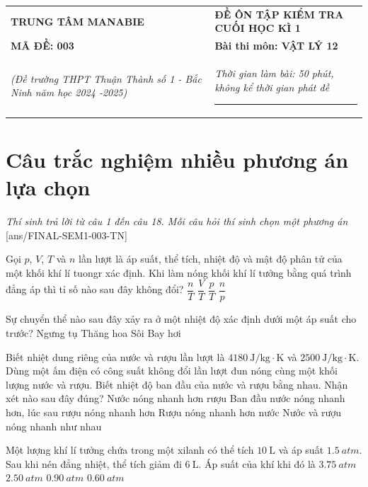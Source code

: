 \begin{tabular}{M{6.5cm}M{11cm}}
	\textbf{TRUNG TÂM MANABIE}& \textbf{ĐỀ ÔN TẬP KIỂM TRA CUỐI HỌC KÌ 1}\\
	\textbf{MÃ ĐỀ: 003}& \textbf{Bài thi môn: VẬT LÝ 12}\\
	\textit{(Đề trường THPT Thuận Thành số 1 - Bắc Ninh năm học 2024 -2025)}& \textit{Thời gian làm bài: 50 phút, không kể thời gian phát đề}
	
	\noindent\rule{4cm}{0.8pt} \\
\end{tabular}
\setcounter{section}{0}
\section{Câu trắc nghiệm nhiều phương án lựa chọn}
\textit{Thí sinh trả lời từ câu 1 đến câu 18. Mỗi câu hỏi thí sinh chọn một phương án}
\setcounter{ex}{0}
[ans/FINAL-SEM1-003-TN]
\begin{ex}
	Gọi $p$, $V$, $T$ và $n$ lần lượt là áp suất, thể tích, nhiệt độ và mật độ phân tử của một khối khí lí tuongr xác định. Khi làm nóng khối khí lí tưởng bằng quá trình đẳng áp thì tỉ số nào sau đây không đổi?
	\choice
	{$\dfrac{n}{T}$}
	{\True $\dfrac{V}{T}$}
	{$\dfrac{p}{T}$}
	{$\dfrac{n}{p}$}
	\loigiai{}
\end{ex}
\begin{ex}
	Sự chuyển thể nào sau đây xảy ra ở một nhiệt độ xác định dưới một áp suất cho trước?
	\choice
	{Ngưng tụ}
	{Thăng hoa}
	{\True Sôi}
	{Bay hơi}
	\loigiai{}
\end{ex}
\begin{ex}
	Biết nhiệt dung riêng của nước và rượu lần lượt là $\SI{4180}{\joule/\kilogram\cdot\kelvin}$ và $\SI{2500}{\joule/\kilogram\cdot\kelvin}$. Dùng một ấm điện có công suất không đổi lần lượt đun nóng cùng một khối lượng nước và rượu. Biết nhiệt độ ban đầu của nước và rượu bằng nhau. Nhận xét nào sau đây đúng?
	\choice
	{Nước nóng nhanh hơn rượu}
	{Ban đầu nước nóng nhanh hơn, lúc sau rượu nóng nhanh hơn}
	{\True Rượu nóng nhanh hơn nước}
	{Nước và rượu nóng nhanh như nhau}
	\loigiai{}
\end{ex}
\begin{ex}
	Một lượng khí lí tưởng chứa trong một xilanh có thể tích $\SI{10}{\liter}$ và áp suất $\SI{1.5}{atm}$. Sau khi nén đẳng nhiệt, thể tích giảm đi $\SI{6}{\liter}$. Áp suất của khí khi đó là
	\choice
	{\True $\SI{3.75}{atm}$}
	{$\SI{2.50}{atm}$}
	{$\SI{0.90}{atm}$}
	{$\SI{0.60}{atm}$}
\end{ex}
